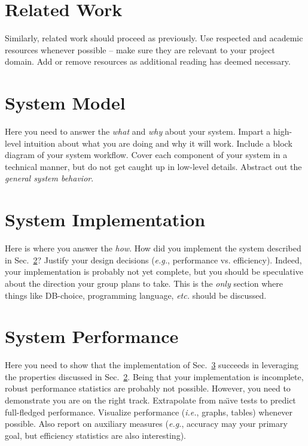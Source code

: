\documentclass{sig-alternate}
\begin{document}
\section{Related Work}
\label{sec:related_work}
Similarly, related work should proceed as previously. Use respected and academic resources whenever possible -- make sure they are relevant to your project domain. Add or remove resources as additional reading has deemed necessary.

\section{System Model}
\label{sec:sys_model}
Here you need to answer the \textit{what} and \textit{why} about your system. Impart a high-level intuition about what you are doing and why it will work. Include a block diagram of your system workflow. Cover each component of your system in a technical manner, but do not get caught up in low-level details. Abstract out the \textit{general system behavior}.

\section{System Implementation}
\label{sec:sys_implement}
Here is where you answer the \textit{how}. How did you implement the system described in Sec.~\ref{sec:sys_model}? Justify your design decisions (\textit{e.g.}, performance vs. efficiency). Indeed, your implementation is probably not yet complete, but you should be speculative about the direction your group plans to take. This is the \textit{only} section where things like DB-choice, programming language, \textit{etc.} should be discussed. 

\section{System Performance}
\label{sec:sys_perform}
Here you need to show that the implementation of Sec.~\ref{sec:sys_implement} succeeds in leveraging the properties discussed in Sec.~\ref{sec:sys_model}. Being that your implementation is incomplete, robust performance statistics are probably not possible. However, you need to demonstrate you are on the right track. Extrapolate from na\"\i ve tests to predict full-fledged performance. Visualize performance (\textit{i.e.}, graphs, tables) whenever possible.  Also report on auxiliary measures (\textit{e.g.}, accuracy may your primary goal, but efficiency statistics are also interesting). 
\end{document}
